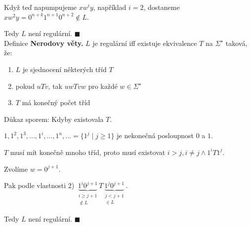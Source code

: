Když teď napumpujeme $xw^i y$, například $i=2$, dostaneme $xw^2 y = 0^{n+k} 1^{n+1} 0^{n+2} \not\in L$.

Tedy $L$ není regulární. $\blacksquare$\\

\noindent
Definice \textbf{Nerodovy věty.} $L$ je regulární iff existuje ekvivalence $T$ na $\Sigma^\star$ taková, že:
\begin{enumerate}[1), noitemsep]
    \item $L$ je sjednocení některých tříd $T$
    \item pokud $uTv$, tak $uwTvw$ pro každé $w \in \Sigma^\star$
    \item $T$ má konečný počet tříd
\end{enumerate}
Důkaz sporem:
Kdyby existovala $T$.

$1, 1^2, 1^3, ..., 1^i, ..., 1^n, ... = \{1^j \mid j \geq 1\}$ je nekonečná posloupnost $0$ a $1$. 

$T$ musí mít konečně mnoho tříd, proto musí existovat $i > j, i \not= j \land 1^i T 1^j$.

Zvolíme $w = 0^{j + 1}$.

Pak podle vlastnosti 2) $\underbrace{1^i 0^{j+1}}_{\substack{i \geq j+1 \\ \not\in L}} T 
\underbrace{1^j 0^{j+1}}_{\substack{j < j+1 \\\in L }}$.

Tedy $L$ není regulární. $\blacksquare$